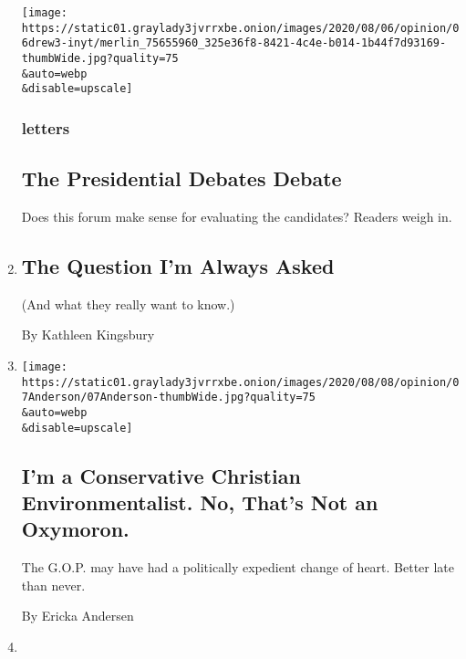 \begin{enumerate}
  \texttt{[image: https://static01.graylady3jvrrxbe.onion/images/2020/08/06/opinion/06drew3-inyt/merlin\_75655960\_325e36f8-8421-4c4e-b014-1b44f7d93169-thumbWide.jpg?quality=75\\\&auto=webp\\\&disable=upscale]}

  \hypertarget{letters-1}{%
  \subsubsection{letters}\label{letters-1}}

  \hypertarget{the-presidential-debates-debate}{%
  \subsection{The Presidential Debates
  Debate}\label{the-presidential-debates-debate}}

  Does this forum make sense for evaluating the candidates? Readers
  weigh in.
\item
  \href{/2020/08/07/opinion/the-question-im-always-asked.html}{}

  \hypertarget{the-question-im-always-asked}{%
  \subsection{The Question I'm Always
  Asked}\label{the-question-im-always-asked}}

  (And what they really want to know.)

  By Kathleen Kingsbury
\item
  \href{/2020/08/07/opinion/republicans-climate-change.html}{}

  \texttt{[image: https://static01.graylady3jvrrxbe.onion/images/2020/08/08/opinion/07Anderson/07Anderson-thumbWide.jpg?quality=75\\\&auto=webp\\\&disable=upscale]}

  \hypertarget{im-a-conservative-christian-environmentalist-no-thats-not-an-oxymoron-1}{%
  \subsection{I'm a Conservative Christian Environmentalist. No, That's
  Not an
  Oxymoron.}\label{im-a-conservative-christian-environmentalist-no-thats-not-an-oxymoron-1}}

  The G.O.P. may have had a politically expedient change of heart.
  Better late than never.

  By Ericka Andersen
\item
  \href{/2020/08/07/opinion/latina-women-politics.html}{}


\end{enumerate}
